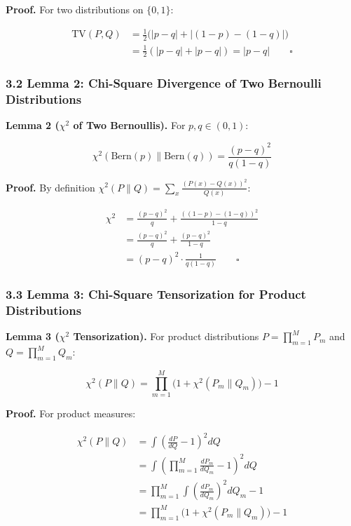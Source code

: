 \documentclass[
  12pt,
]{ctexart}
\begin{document}
\textbf{Proof.} For two distributions on \(\{0,1\}\):

\[\begin{aligned}
\text{TV}(P, Q) &= \frac{1}{2} \bigl(|p - q| + |(1-p) - (1-q)|\bigr) \\
&= \frac{1}{2}(|p-q| + |p-q|) = |p-q| \qquad \square
\end{aligned}\]

\subsubsection{3.2 Lemma 2: Chi-Square Divergence of Two Bernoulli
Distributions}\label{lemma-2-chi-square-divergence-of-two-bernoulli-distributions}

\textbf{Lemma 2 (\(\chi^2\) of Two Bernoullis).} For \(p, q \in (0,1)\):

\[\chi^2(\text{Bern}(p) \parallel \text{Bern}(q)) = \frac{(p-q)^2}{q(1-q)}\]

\textbf{Proof.} By definition
\(\chi^2(P \parallel Q) = \sum_x \frac{(P(x)-Q(x))^2}{Q(x)}\):

\[\begin{aligned}
\chi^2 &= \frac{(p-q)^2}{q} + \frac{((1-p)-(1-q))^2}{1-q} \\
&= \frac{(p-q)^2}{q} + \frac{(p-q)^2}{1-q} \\
&= (p-q)^2 \cdot \frac{1}{q(1-q)} \qquad \square
\end{aligned}\]

\subsubsection{3.3 Lemma 3: Chi-Square Tensorization for Product
Distributions}\label{lemma-3-chi-square-tensorization-for-product-distributions}

\textbf{Lemma 3 (\(\chi^2\) Tensorization).} For product distributions
\(P = \prod_{m=1}^M P_m\) and \(Q = \prod_{m=1}^M Q_m\):

\[\chi^2(P \parallel Q) = \prod_{m=1}^M \bigl(1 + \chi^2(P_m \parallel Q_m)\bigr) - 1\]

\textbf{Proof.} For product measures:

\[\begin{aligned}
\chi^2(P \parallel Q) &= \int \left(\frac{dP}{dQ} - 1\right)^2 dQ \\
&= \int \left(\prod_{m=1}^M \frac{dP_m}{dQ_m} - 1\right)^2 dQ \\
&= \prod_{m=1}^M \int \left(\frac{dP_m}{dQ_m}\right)^2 dQ_m - 1 \\
&= \prod_{m=1}^M \bigl(1 + \chi^2(P_m \parallel Q_m)\bigr) - 1
\end{aligned}\]
\end{document}
